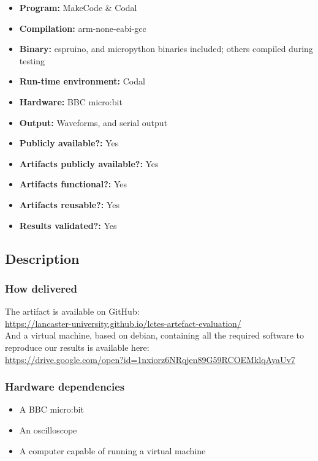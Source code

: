 {\small
\begin{itemize}
  \item {\bf Program:} MakeCode \& Codal
  \item {\bf Compilation:} arm-none-eabi-gcc
  \item {\bf Binary:} espruino, and micropython binaries included; others compiled during testing
  \item {\bf Run-time environment:} Codal
  \item {\bf Hardware:} BBC micro:bit
  \item {\bf Output:} Waveforms, and serial output
  \item {\bf Publicly available?:} Yes
  \item {\bf Artifacts publicly available?:} Yes
  \item {\bf Artifacts functional?:} Yes
  \item {\bf Artifacts reusable?:} Yes
  \item {\bf Results validated?:} Yes
\end{itemize}

\subsection{Description}

\subsubsection{How delivered}

The artifact is available on GitHub:\\[5pt]\url{https://lancaster-university.github.io/lctes-artefact-evaluation/}\\[5pt] And a virtual machine, based on debian, containing all the required software to reproduce our results is available here:\\[5pt]\url{https://drive.google.com/open?id=1nxiorz6NRqjen89G59RCOEMklqAyaUv7}

\subsubsection{Hardware dependencies}

\begin{itemize}
    \item A BBC micro:bit
    \item An oscilloscope
    \item A computer capable of running a virtual machine
\end{itemize}

}
